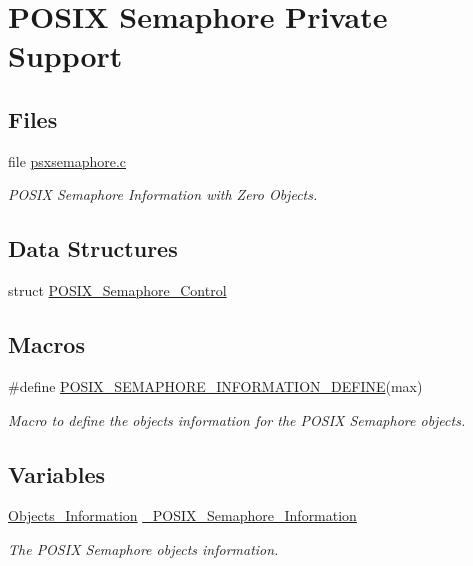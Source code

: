 \hypertarget{group__POSIXSemaphorePrivate}{}\section{P\+O\+S\+IX Semaphore Private Support}
\label{group__POSIXSemaphorePrivate}
\subsection*{Files}
\begin{DoxyCompactItemize}
\item 
file \mbox{\hyperlink{psxsemaphore_8c}{psxsemaphore.\+c}}
\begin{DoxyCompactList}\small\item\em P\+O\+S\+IX Semaphore Information with Zero Objects. \end{DoxyCompactList}\end{DoxyCompactItemize}
\subsection*{Data Structures}
\begin{DoxyCompactItemize}
\item 
struct \mbox{\hyperlink{structPOSIX__Semaphore__Control}{P\+O\+S\+I\+X\+\_\+\+Semaphore\+\_\+\+Control}}
\end{DoxyCompactItemize}
\subsection*{Macros}
\begin{DoxyCompactItemize}
\item 
\#define \mbox{\hyperlink{group__POSIXSemaphorePrivate_gac43ca62346fb7a8a794d287632a7b4b4}{P\+O\+S\+I\+X\+\_\+\+S\+E\+M\+A\+P\+H\+O\+R\+E\+\_\+\+I\+N\+F\+O\+R\+M\+A\+T\+I\+O\+N\+\_\+\+D\+E\+F\+I\+NE}}(max)
\begin{DoxyCompactList}\small\item\em Macro to define the objects information for the P\+O\+S\+IX Semaphore objects. \end{DoxyCompactList}\end{DoxyCompactItemize}
\subsection*{Variables}
\begin{DoxyCompactItemize}
\item 
\mbox{\label{group__POSIXSemaphorePrivate_ga8521f1426bb16a3457d8305626608a7a}} 
\mbox{\hyperlink{structObjects__Information}{Objects\+\_\+\+Information}} \mbox{\hyperlink{group__POSIXSemaphorePrivate_ga8521f1426bb16a3457d8305626608a7a}{\+\_\+\+P\+O\+S\+I\+X\+\_\+\+Semaphore\+\_\+\+Information}}
\begin{DoxyCompactList}\small\item\em The P\+O\+S\+IX Semaphore objects information. \end{DoxyCompactList}\end{DoxyCompactItemize}


